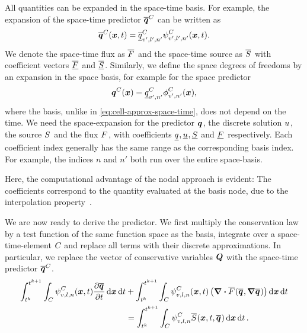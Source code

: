 All quantities can be expanded in the space-time basis.
For example, the expansion of the space-time predictor $\stpredictor[\cell]$ can be written as
\begin{equation}
  \label{eq:cell-approx-space-time}
  \stpredictor[\cell] (\bm{x}, t) = \stpredictorCoeff[\cell][v',l',n'] \stbasis[\cell][v',l',n'](\bm{x}, t).
\end{equation}
We denote the space-time flux as $\stflux$ and the space-time source as $\stsource$ with coefficient vectors $\stfluxCoeff$ and $\stsourceCoeff$.
Similarly, we define the space degrees of freedoms by an expansion in the space basis, for example for the space predictor
\begin{equation}
  \label{eq:cell-approx-space}
  \spredictor[\cell] (\bm{x}) = \spredictorCoeff[\cell][v',n'] \sbasis[\cell][v',n'] (\bm{x}),
\end{equation}
where the basis, unlike in \cref{eq:cell-approx-space-time}, does not depend on the time.
We need the space-expansion for the predictor $\spredictor$, the discrete solution $\ssol$, the source $\ssource$ and the flux $\sflux$,
with coefficients $\spredictorCoeff, \ssolCoeff, \ssourceCoeff$ and $\sfluxCoeff$ respectively.
Each coefficient index generally has the same range as the corresponding basis index.
For example, the indices $n$ and $n'$ both run over the entire space-basis.

Here, the computational advantage of the nodal approach is evident:
The coefficients correspond to the quantity evaluated at the basis node, due to the interpolation property~.

We are now ready to derive the predictor.
We first multiply the conservation law by a test function of the same function space as the basis, integrate over a space-time-element $C_{}$ and replace all terms with their discrete approximations.
In particular, we replace the vector of conservative variables $\bm{Q}$ with the space-time predictor $\stpredictor[\cell]$.
\begin{align}\label{eq:weak-pde-space-time}
\begin{split}
\intdt{\intdcell{
    \sttestfunction[\cell][v,l,n](\bm{x}, t)
    \pdv{\stpredictor}{t}
}}
&+
\intdt{\intdcell{
    \sttestfunction[\cell][v,l,n](\bm{x}, t)
    \left(
      \divergence{\stflux(\stpredictor, \gradient{\stpredictor})}
    \right)
}}
\\&=
\intdt{\intdcell{
  \sttestfunction[\cell][v,l,n] \stsource(\bm{x}, t, \stpredictor)
}}.
\end{split}
\end{align}

